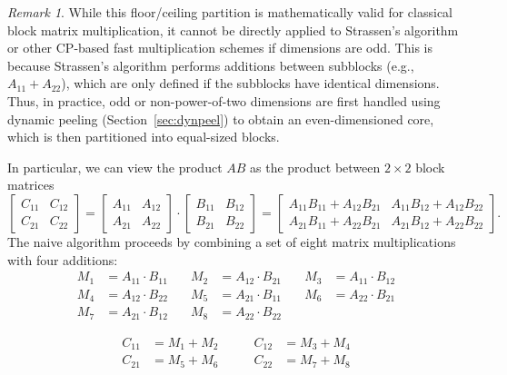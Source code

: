 \documentclass[a4paper, leqno, 11pt]{article}
\theoremstyle{definition}
\theoremstyle{remark}
\newtheorem{remark}[theorem]{Remark}
\theoremstyle{experimental}
\begin{document}
\begin{remark}
  While this floor/ceiling partition is mathematically valid for classical block matrix multiplication, it cannot be directly applied to Strassen's algorithm or other CP-based fast multiplication schemes if dimensions are odd. This is because Strassen's algorithm performs additions between subblocks (e.g., $A_{11} + A_{22}$), which are only defined if the subblocks have identical dimensions. Thus, in practice, odd or non-power-of-two dimensions are first handled using dynamic peeling (Section~\ref{sec:dynpeel}) to obtain an even-dimensioned core, which is then partitioned into equal-sized blocks.
\end{remark}
In particular, we can view the product $ AB $ as the product between $ 2\times 2 $ block matrices 
\begin{equation}
  \label{eq:matprod}
  \begin{bmatrix}
    C_{11} & C_{12} \\
    C_{21} & C_{22}
  \end{bmatrix} =
  \begin{bmatrix}
    A_{11} & A_{12} \\
    A_{21} & A_{22}
  \end{bmatrix} \cdot 
  \begin{bmatrix}
    B_{11} & B_{12} \\
    B_{21} & B_{22}
  \end{bmatrix} =
  \begin{bmatrix}
    A_{11}B_{11} + A_{12}B_{21} & A_{11}B_{12} + A_{12}B_{22} \\
    A_{21}B_{11} + A_{22}B_{21} & A_{21}B_{12} + A_{22}B_{22}
  \end{bmatrix}.
\end{equation}
The naive algorithm proceeds by combining a set of eight matrix multiplications with four
additions:
\[
\begin{aligned}
M_1 &= A_{11} \cdot B_{11} &\quad M_2 &= A_{12} \cdot B_{21} &\quad M_3 &= A_{11} \cdot B_{12} \\
M_4 &= A_{12} \cdot B_{22} &\quad M_5 &= A_{21} \cdot B_{11} &\quad M_6 &= A_{22} \cdot B_{21} \\
M_7 &= A_{21} \cdot B_{12} &\quad M_8 &= A_{22} \cdot B_{22} & &
\end{aligned}
\]

\[
\begin{aligned}
C_{11} &= M_1 + M_2 &\qquad C_{12} &= M_3 + M_4 \\
C_{21} &= M_5 + M_6 &\qquad C_{22} &= M_7 + M_8
\end{aligned}
\]
\end{document}
